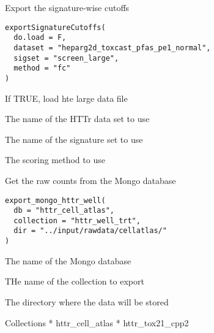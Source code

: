 \documentclass[letterpaper]{book}
\begin{document}
%
\begin{Description}\relax
Export the signature-wise cutoffs
\end{Description}
%
\begin{Usage}
\begin{verbatim}
exportSignatureCutoffs(
  do.load = F,
  dataset = "heparg2d_toxcast_pfas_pe1_normal",
  sigset = "screen_large",
  method = "fc"
)
\end{verbatim}
\end{Usage}
%
\begin{Arguments}
\begin{ldescription}
\item[\code{do.load}] If TRUE, load hte large data file

\item[\code{dataset}] The name of the HTTr data set to use

\item[\code{sigset}] The name of the signature set to use

\item[\code{method}] The scoring method to use
\end{ldescription}
\end{Arguments}
%
\begin{Description}\relax
Get the raw counts from the Mongo database
\end{Description}
%
\begin{Usage}
\begin{verbatim}
export_mongo_httr_well(
  db = "httr_cell_atlas",
  collection = "httr_well_trt",
  dir = "../input/rawdata/cellatlas/"
)
\end{verbatim}
\end{Usage}
%
\begin{Arguments}
\begin{ldescription}
\item[\code{db}] The name of the Mongo database

\item[\code{collection}] THe name of the collection to export

\item[\code{dir}] The directory where the data will be stored

Collections
* httr\_cell\_atlas
* httr\_tox21\_cpp2
\end{ldescription}
\end{Arguments}
\end{document}

